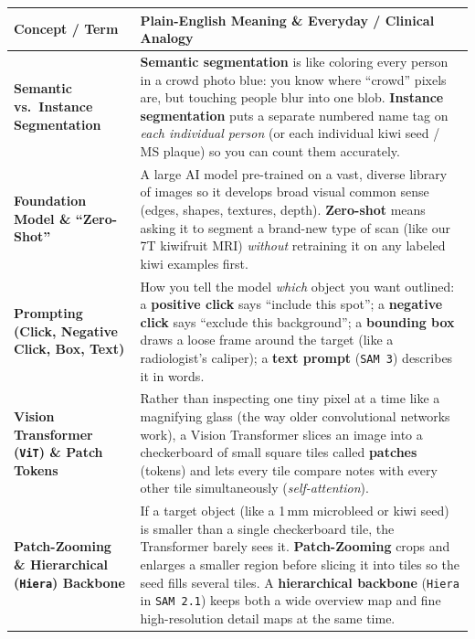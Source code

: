 \documentclass[10.5pt,a4paper]{article}
\begin{document}
\begin{table}[H]
\centering
\footnotesize
\renewcommand{\arraystretch}{1.18}
\begin{tabularx}{\textwidth}{L{3.55cm} Y}
\toprule
{}
\textbf{Concept / Term} & \textbf{Plain-English Meaning \& Everyday / Clinical Analogy} \\
\midrule
\textbf{Semantic vs.\ Instance Segmentation} & \textbf{Semantic segmentation} is like coloring every person in a crowd photo blue: you know where ``crowd'' pixels are, but touching people blur into one blob. \textbf{Instance segmentation} puts a separate numbered name tag on \emph{each individual person} (or each individual kiwi seed / MS plaque) so you can count them accurately. \\
\textbf{Foundation Model \& ``Zero-Shot''} & A large AI model pre-trained on a vast, diverse library of images so it develops broad visual common sense (edges, shapes, textures, depth). \textbf{Zero-shot} means asking it to segment a brand-new type of scan (like our 7T kiwifruit MRI) \emph{without} retraining it on any labeled kiwi examples first. \\
\textbf{Prompting (Click, Negative Click, Box, Text)} & How you tell the model \emph{which} object you want outlined: a \textbf{positive click} says ``include this spot''; a \textbf{negative click} says ``exclude this background''; a \textbf{bounding box} draws a loose frame around the target (like a radiologist's caliper); a \textbf{text prompt} (\texttt{SAM 3}) describes it in words. \\
\textbf{Vision Transformer (\texttt{ViT}) \& Patch Tokens} & Rather than inspecting one tiny pixel at a time like a magnifying glass (the way older convolutional networks work), a Vision Transformer slices an image into a checkerboard of small square tiles called \textbf{patches} (tokens) and lets every tile compare notes with every other tile simultaneously (\emph{self-attention}). \\
\textbf{Patch-Zooming \& Hierarchical (\texttt{Hiera}) Backbone} & If a target object (like a 1\,mm microbleed or kiwi seed) is smaller than a single checkerboard tile, the Transformer barely sees it. \textbf{Patch-Zooming} crops and enlarges a smaller region before slicing it into tiles so the seed fills several tiles. A \textbf{hierarchical backbone} (\texttt{Hiera} in \texttt{SAM 2.1}) keeps both a wide overview map and fine high-resolution detail maps at the same time. \\

\end{tabularx}
\end{table}
\end{document}
